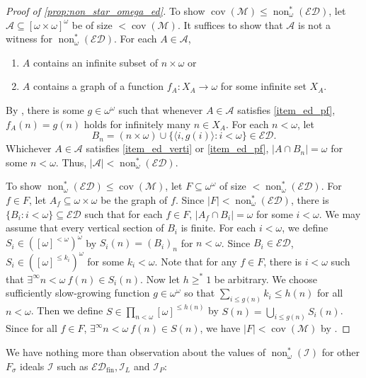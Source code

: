 \documentclass[a4paper,12pt]{amsart}
\theoremstyle{definition}
\numberwithin{thm}{section}
\numberwithin{equation}{section}
\newcommand{\oo}{{\omega}^\omega}
\DeclareMathOperator{\non}{non}
\DeclareMathOperator{\cov}{cov}
\newcommand{\covm}{\cov(\mathcal{M})}
\newcommand{\ed}{\mathcal{ED}}
\newcommand{\I}{\mathscr{I}}
\newcommand{\edfin}{\mathcal{ED}_\mathrm{fin}}
\newcommand{\calA}{\mathcal{A}}
\renewcommand{\subset}{\subseteq}
\begin{document}
    \begin{proof}[Proof of \cref{prop:non_star_omega_ed}]
        To show $\covm\leq\non^*_\omega(\ed)$, let $\mathcal{A}\subseteq[\omega\times\omega]^\omega$ be of size $<\covm$. It suffices to show that $\mathcal{A}$ is not a witness for $\non^*_\omega(\ed)$. For each $A\in\calA$,
        \begin{enumerate}
            \item $A$ contains an infinite subset of $n\times\omega$ or \label{item_ed_verti}
            \item $A$ contains a graph of a function $f_A\colon X_A\to\omega$ for some infinite set $X_A$. \label{item_ed_pf}
        \end{enumerate}
        By , there is some $g\in\oo$ such that whenever $A\in\mathcal{A}$ satisfies \eqref{item_ed_pf}, $f_A(n)=g(n)$ holds for infinitely many $n\in X_A$. For each $n<\omega$, let
        \[
        B_n=(n\times\omega)\cup\{\langle i,g(i)\rangle:i<\omega\}\in\ed.
        \]
        Whichever $A\in\mathcal{A}$ satisfies \eqref{item_ed_verti} or \eqref{item_ed_pf}, $\lvert A\cap B_n\rvert = \omega$ for some $n<\omega$. Thus, $\lvert\mathcal{A}\rvert<\non^*_\omega(\ed)$.
	
        To show $\non^*_\omega(\ed)\leq\covm$, let $F\subseteq\oo$ of size $<\non^*_\omega(\ed)$. For $f\in F$, let $A_f\subseteq\omega\times\omega$ be the graph of $f$. Since $\lvert F\rvert<\non^*_\omega(\ed)$, there is $\{B_i:i<\omega\}\subset\ed$ such that for each $f\in F$, $\lvert A_f\cap B_i\rvert=\omega$ for some $i<\omega$. We may assume that every vertical section of $B_i$ is finite. For each $i<\omega$, we define $S_i\in([\omega]^{<\omega})^\omega$ by $S_i(n) = (B_i)_n$ for $n<\omega$. Since $B_i\in\ed$, $S_i\in([\omega]^{\leq k_i})^\omega$ for some $k_i<\omega$. Note that for any $f\in F$, there is $i<\omega$ such that $\exists^\infty n<\omega~f(n)\in S_i(n)$. Now let $h\geq^* 1$ be arbitrary. We choose sufficiently slow-growing function $g\in\omega^\omega$ so that $\sum_{i\leq g(n)}k_i\leq h(n)$ for all $n<\omega$. Then we define $S\in\prod_{n<\omega}[\omega]^{\leq h(n)}$ by $S(n) = \bigcup_{i\leq g(n)}S_i(n)$. Since for all $f\in F$, $\exists^\infty n<\omega~f(n)\in S(n)$, we have $\lvert F\rvert<\covm$ by .
    \end{proof}

    We have nothing more than observation about the values of $\non^*_\omega(\I)$ for other $F_\sigma$ ideals $\I$ such as $\edfin, \I_L$ and $\I_P$:
    
\end{document}
